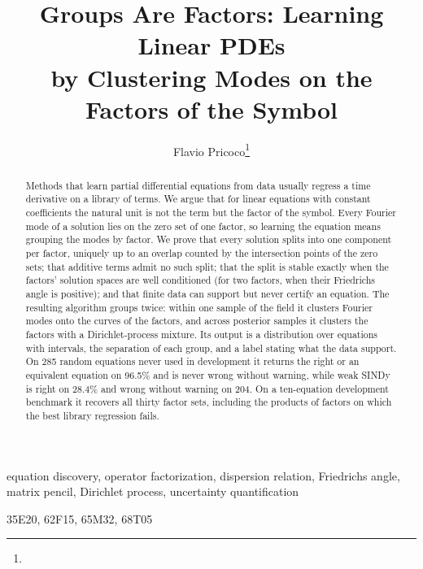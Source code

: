 \title{Groups Are Factors: Learning Linear PDEs\\by Clustering Modes on the Factors of the Symbol}
\author{Flavio Pricoco\thanks{}}


\maketitle

\begin{abstract}
Methods that learn partial differential equations from data usually regress a time derivative on a library of terms.
We argue that for linear equations with constant coefficients the natural unit is not the term but the factor of the
symbol. Every Fourier mode of a solution lies on the zero set of one factor, so learning the equation means grouping
the modes by factor. We prove that every solution splits into one component per factor, uniquely up to an overlap
counted by the intersection points of the zero sets; that additive terms admit no such split; that the split is stable
exactly when the factors' solution spaces are well conditioned (for two factors, when their Friedrichs angle is
positive); and that finite data can support but never certify an equation. The resulting algorithm groups twice:
within one sample of the field it clusters Fourier modes onto the curves of the factors, and across posterior samples
it clusters the factors with a Dirichlet-process mixture. Its output is a distribution over equations with intervals,
the separation of each group, and a label stating what the data support. On 285 random equations never used in
development it returns the right or an equivalent equation on 96.5\% and is never wrong without warning, while weak
SINDy is right on 28.4\% and wrong without warning on 204. On a ten-equation development benchmark it recovers all
thirty factor sets, including the products of factors on which the best library regression fails.
\end{abstract}

\begin{keywords}
equation discovery, operator factorization, dispersion relation, Friedrichs angle, matrix pencil, Dirichlet process,
uncertainty quantification
\end{keywords}

\begin{MSCcodes}
35E20, 62F15, 65M32, 68T05
\end{MSCcodes}

